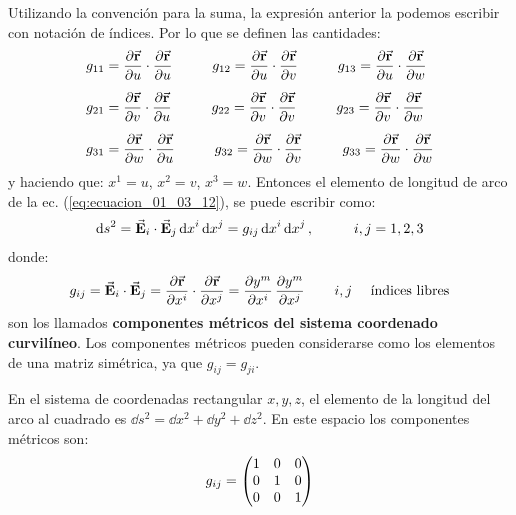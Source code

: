 \documentclass[hidelinks,12pt]{article}
\begin{document}
Utilizando la convención para la suma, la expresión anterior la podemos escribir con notación de índices. Por lo que se definen las cantidades:
\begin{align*}
g_{11} &= \pdv{\va{r}}{u} \cdot \pdv{\va{r}}{u} \hspace{1cm} g_{12} = \pdv{\va{r}}{u} \cdot \pdv{\va{r}}{v} \hspace{1cm} g_{13} = \pdv{\va{r}}{u} \cdot \pdv{\va{r}}{w} \\[0.5em]
g_{21} &= \pdv{\va{r}}{v} \cdot \pdv{\va{r}}{u} \hspace{1cm} g_{22} = \pdv{\va{r}}{v} \cdot \pdv{\va{r}}{v} \hspace{1cm} g_{23} = \pdv{\va{r}}{v} \cdot \pdv{\va{r}}{w} \\[0.5em]
g_{31} &= \pdv{\va{r}}{w} \cdot \pdv{\va{r}}{u} \hspace{1cm} g_{32} = \pdv{\va{r}}{w} \cdot \pdv{\va{r}}{v} \hspace{1cm} g_{33} = \pdv{\va{r}}{w} \cdot \pdv{\va{r}}{w}
\end{align*}
y haciendo que: $x^{1} = u$, $x^{2} = v$, $x^{3} = w$. Entonces el elemento de longitud de arco de la ec. (\ref{eq:ecuacion_01_03_12}), se puede escribir como:
\begin{align*}
\dd{s}^{2} = \va{E}_{i} \cdot \va{E}_{j} \dd{x}^{i} \dd{x}^{j} = g_{ij} \dd{x}^{i} \dd{x}^{j}, \hspace{1cm} i, j = 1, 2, 3
\end{align*}
donde:
\begin{align}
g_{ij} = \va{E}_{i} \cdot \va{E}_{j} = \pdv{\va{r}}{x^{i}} \cdot \pdv{\va{r}}{x^{j}} = \pdv{y^{m}}{x^{i}} \, \pdv{y^{m}}{x^{j}} \hspace{0.75cm} i, j \quad \mbox{ índices libres}
\label{eq:ecuacion_01_03_13}
\end{align}
son los llamados \textbf{componentes métricos del sistema coordenado curvilíneo}. Los componentes métricos pueden considerarse como los elementos de una matriz simétrica, ya que $g_{ij} = g_{ji}$.
\par
En el sistema de coordenadas rectangular $x, y, z$, el elemento de la longitud del arco al cuadrado es $\dd{s}^{2} = \dd{x}^{2} + \dd{y}^{2} + \dd{z}^{2}$. En este espacio los componentes métricos son:
\begin{align*}
g_{ij} = \mqty(
1 & 0 & 0 \\
0 & 1 & 0 \\
0 & 0 & 1 )
\end{align*}
\end{document}
